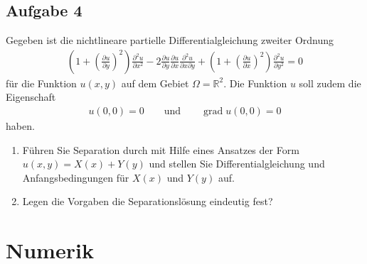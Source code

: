 \documentclass[
	final,
	a4paper,
	oneside,
	parskip=full,
	headings=standardclasses,
	headings=big,
	pointednumbers
]{scrartcl}
\begin{document}
    \subsection*{Aufgabe 4}

    Gegeben ist die nichtlineare partielle Differentialgleichung zweiter Ordnung
    \begin{align}
        \left( 1 + \left( \frac{\partial u}{\partial y} \right)^2 \right) \frac{\partial^2 u}{\partial x^2} -
        2 \frac{\partial u}{\partial y} \frac{\partial u}{\partial x} \frac{\partial^2 u}{\partial x \partial y} +
        \left( 1 + \left( \frac{\partial u}{\partial x} \right)^2 \right) \frac{\partial^2 u}{\partial y^2} = 0
    \end{align}
    für die Funktion $u{\left(x,  y\right)}$ auf dem Gebiet $\Omega = \mathbb{R}^2$. Die Funktion $u$ soll zudem
    die Eigenschaft
    \begin{align*}
        u{\left(0, 0 \right)} = 0 \qquad \text{und} \qquad \operatorname{grad}{u{\left(0, 0\right)}} = 0
    \end{align*}
    haben.
    \begin{enumerate}
        \item Führen Sie Separation durch mit Hilfe eines Ansatzes der Form
              $u{\left(x,  y\right)} = X{\left(x\right)} + Y{\left(y\right)}$ und stellen
              Sie Differentialgleichung und Anfangsbedingungen für $X{\left(x\right)}$ und
              $Y{\left(y\right)}$ auf.
        \item Legen die Vorgaben die Separationslösung eindeutig fest?
    \end{enumerate}

    \newpage
    
    \section*{Numerik}
\end{document}
